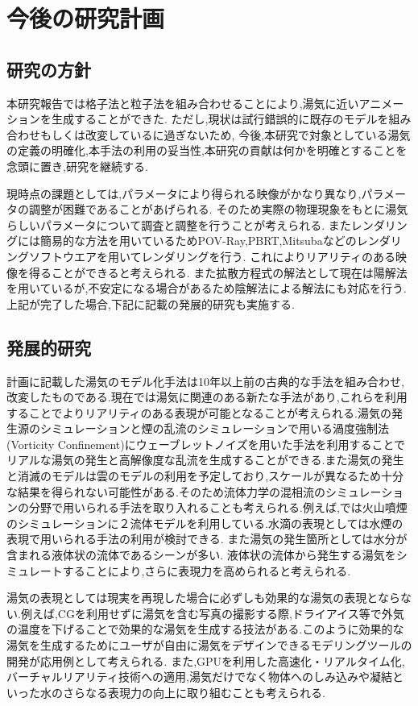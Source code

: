 \section{今後の研究計画}

\subsection{研究の方針}

本研究報告では格子法と粒子法を組み合わせることにより,湯気に近いアニメーションを生成することができた.
ただし,現状は試行錯誤的に既存のモデルを組み合わせもしくは改変しているに過ぎないため,
今後,本研究で対象としている湯気の定義の明確化,本手法の利用の妥当性,本研究の貢献は何かを明確とすることを念頭に置き,研究を継続する.

現時点の課題としては,パラメータにより得られる映像がかなり異なり,パラメータの調整が困難であることがあげられる.
そのため実際の物理現象をもとに湯気らしいパラメータについて調査と調整を行うことが考えられる.
またレンダリングには簡易的な方法を用いているためPOV-Ray,PBRT,Mitsubaなどのレンダリングソフトウエアを用いてレンダリングを行う.
これによりリアリティのある映像を得ることができると考えられる.
また拡散方程式の解法として現在は陽解法を用いているが,不安定になる場合があるため陰解法による解法にも対応を行う.
上記が完了した場合,下記に記載の発展的研究も実施する.

\subsection{発展的研究}
計画に記載した湯気のモデル化手法は10年以上前の古典的な手法を組み合わせ,改変したものである.現在では湯気に関連のある新たな手法があり,これらを利用することでよりリアリティのある表現が可能となることが考えられる.湯気の発生源のシミュレーションと煙の乱流のシミュレーションで用いる渦度強制法(Vorticity Confinement)にウェーブレットノイズを用いた手法\cite{Kim2008}を利用することでリアルな湯気の発生と高解像度な乱流を生成することができる.また湯気の発生と消滅のモデルは雲のモデルの利用を予定しており,スケールが異なるため十分な結果を得られない可能性がある.そのため流体力学の混相流のシミュレーションの分野で用いられる手法を取り入れることも考えられる.例えば,\cite{Mizuno2003}では火山噴煙のシミュレーションに２流体モデルを利用している.水滴の表現としては水煙の表現で用いられる手法\cite{Nielsen2013}の利用が検討できる.
また湯気の発生箇所としては水分が含まれる液体状の流体であるシーンが多い.
液体状の流体から発生する湯気をシミュレートすることにより,さらに表現力を高められると考えられる.

湯気の表現としては現実を再現した場合に必ずしも効果的な湯気の表現とならない.例えば,CGを利用せずに湯気を含む写真の撮影する際,ドライアイス等で外気の温度を下げることで効果的な湯気を生成する技法がある.このように効果的な湯気を生成するためにユーザが自由に湯気をデザインできるモデリングツールの開発が応用例として考えられる.
また,GPUを利用した高速化・リアルタイム化,バーチャルリアリティ技術への適用,湯気だけでなく物体へのしみ込みや凝結といった水のさらなる表現力の向上に取り組むことも考えられる.

